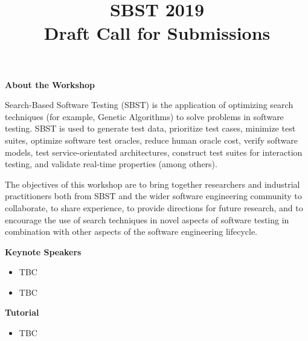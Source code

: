 \documentclass[10pt,conference]{IEEEtran}
\title{SBST 2019\\Draft Call for Submissions}
\begin{document}
\maketitle






\noindent\textbf{About the Workshop}



\smallskip\noindent Search-Based Software Testing (SBST) is the
application of optimizing search techniques (for example, Genetic
Algorithms) to solve problems in software testing. SBST is used to
generate test data, prioritize test cases, minimize test suites,
optimize software test oracles, reduce human oracle cost, verify
software models, test service-orientated architectures, construct test
suites for interaction testing, and validate real-time properties
(among others).

\smallskip\noindent The objectives of this workshop are to bring
together researchers and industrial practitioners both from SBST and
the wider software engineering community to collaborate, to share
experience, to provide directions for future research, and to
encourage the use of search techniques in novel aspects of software
testing in combination with other aspects of the software engineering
lifecycle.





\smallskip\noindent\textbf{Keynote Speakers}
\begin{itemize}
\setlength{\itemsep}{1pt}
  \setlength{\parskip}{0pt}
  \setlength{\parsep}{0pt}
\item{TBC}
\item{TBC}
\end{itemize}

\smallskip\noindent\textbf{Tutorial}
\begin{itemize}
\setlength{\itemsep}{1pt}
  \setlength{\parskip}{0pt}
  \setlength{\parsep}{0pt}
\item{TBC}
\end{itemize}
\end{document}
